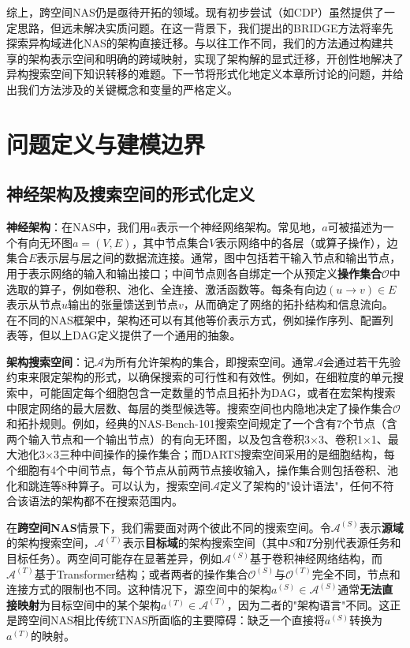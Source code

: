 \documentclass[../main.tex]{subfiles}
\begin{document}
综上，跨空间NAS仍是亟待开拓的领域。现有初步尝试（如CDP）虽然提供了一定思路，但远未解决实质问题。在这一背景下，我们提出的BRIDGE方法将率先探索异构域进化NAS的架构直接迁移。与以往工作不同，我们的方法通过构建共享的架构表示空间和明确的跨域映射，实现了架构解的显式迁移，开创性地解决了异构搜索空间下知识转移的难题。下一节将形式化地定义本章所讨论的问题，并给出我们方法涉及的关键概念和变量的严格定义。

\section{问题定义与建模边界}
\label{sec:chapter4_problem_formulation}

\subsection{神经架构及搜索空间的形式化定义}

\textbf{神经架构}：在NAS中，我们用$a$表示一个神经网络架构。常见地，$a$可被描述为一个有向无环图$a=(V, E)$，其中节点集合$V$表示网络中的各层（或算子操作），边集合$E$表示层与层之间的数据流连接。通常，图中包括若干输入节点和输出节点，用于表示网络的输入和输出接口；中间节点则各自绑定一个从预定义\textbf{操作集合}$\mathcal{O}$中选取的算子，例如卷积、池化、全连接、激活函数等。每条有向边$(u \rightarrow v) \in E$表示从节点$u$输出的张量馈送到节点$v$，从而确定了网络的拓扑结构和信息流向。在不同的NAS框架中，架构还可以有其他等价表示方式，例如操作序列、配置列表等，但以上DAG定义提供了一个通用的抽象。

\textbf{架构搜索空间}：记$\mathcal{A}$为所有允许架构的集合，即搜索空间。通常$\mathcal{A}$会通过若干先验约束来限定架构的形式，以确保搜索的可行性和有效性。例如，在细粒度的单元搜索中，可能固定每个细胞包含一定数量的节点且拓扑为DAG，或者在宏架构搜索中限定网络的最大层数、每层的类型候选等。搜索空间也内隐地决定了操作集合$\mathcal{O}$和拓扑规则。例如，经典的NAS-Bench-101搜索空间规定了一个含有7个节点（含两个输入节点和一个输出节点）的有向无环图，以及包含卷积3×3、卷积1×1、最大池化3×3三种中间操作的操作集合；而DARTS搜索空间采用的是细胞结构，每个细胞有4个中间节点，每个节点从前两节点接收输入，操作集合则包括卷积、池化和跳连等8种算子。可以认为，搜索空间$\mathcal{A}$定义了架构的"设计语法"，任何不符合该语法的架构都不在搜索范围内。

在\textbf{跨空间NAS}情景下，我们需要面对两个彼此不同的搜索空间。令$\mathcal{A}^{(S)}$表示\textbf{源域}的架构搜索空间，$\mathcal{A}^{(T)}$表示\textbf{目标域}的架构搜索空间（其中$S$和$T$分别代表源任务和目标任务）。两空间可能存在显著差异，例如$\mathcal{A}^{(S)}$基于卷积神经网络结构，而$\mathcal{A}^{(T)}$基于Transformer结构；或者两者的操作集合$\mathcal{O}^{(S)}$与$\mathcal{O}^{(T)}$完全不同，节点和连接方式的限制也不同。这种情况下，源空间中的架构$a^{(S)} \in \mathcal{A}^{(S)}$通常\textbf{无法直接映射}为目标空间中的某个架构$a^{(T)} \in \mathcal{A}^{(T)}$，因为二者的"架构语言"不同。这正是跨空间NAS相比传统TNAS所面临的主要障碍：缺乏一个直接将$a^{(S)}$转换为$a^{(T)}$的映射。
\end{document}
